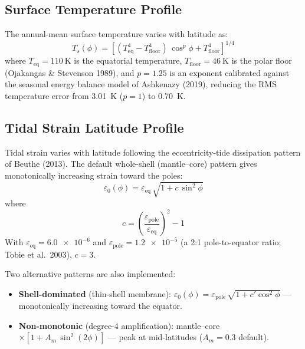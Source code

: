 \documentclass[11pt,a4paper]{article}
\begin{document}
\subsection{Surface Temperature Profile}

The annual-mean surface temperature varies with latitude as:
\begin{equation}
T_s(\phi) = \left[
  (T_{\mathrm{eq}}^4 - T_{\mathrm{floor}}^4)\,\cos^p\!\phi
  + T_{\mathrm{floor}}^4
\right]^{1/4}
\label{eq:Tsurf_lat}
\end{equation}
where $T_{\mathrm{eq}} = \SI{110}{\kelvin}$ is the equatorial
temperature, $T_{\mathrm{floor}} = \SI{46}{\kelvin}$ is the polar
floor (Ojakangas \& Stevenson 1989), and $p = 1.25$ is an exponent
calibrated against the seasonal energy balance model of Ashkenazy (2019),
reducing the RMS temperature error from \SI{3.01}{\kelvin} ($p = 1$) to
\SI{0.70}{\kelvin}.

\subsection{Tidal Strain Latitude Profile}

Tidal strain varies with latitude following the eccentricity-tide
dissipation pattern of Beuthe (2013). The default whole-shell
(mantle--core) pattern gives monotonically increasing strain toward
the poles:
\begin{equation}
\varepsilon_0(\phi)
  = \varepsilon_{\mathrm{eq}}\,\sqrt{1 + c\,\sin^2\!\phi}
\label{eq:strain_lat}
\end{equation}
where
\begin{equation}
c = \left(\frac{\varepsilon_{\mathrm{pole}}}
  {\varepsilon_{\mathrm{eq}}}\right)^{\!2} - 1
\end{equation}
With $\varepsilon_{\mathrm{eq}} = \num{6.0e-6}$ and
$\varepsilon_{\mathrm{pole}} = \num{1.2e-5}$ (a 2:1 pole-to-equator
ratio; Tobie et al.\ 2003), $c = 3$.

Two alternative patterns are also implemented:
\begin{itemize}[leftmargin=2em]
\item \textbf{Shell-dominated} (thin-shell membrane):
  $\varepsilon_0(\phi) = \varepsilon_{\mathrm{pole}}\,
  \sqrt{1 + c'\cos^2\!\phi}$ — monotonically increasing toward the
  equator.
\item \textbf{Non-monotonic} (degree-4 amplification):
  mantle--core $\times [1 + A_m\,\sin^2(2\phi)]$ — peak at
  mid-latitudes ($A_m = 0.3$ default).
\end{itemize}
\end{document}
